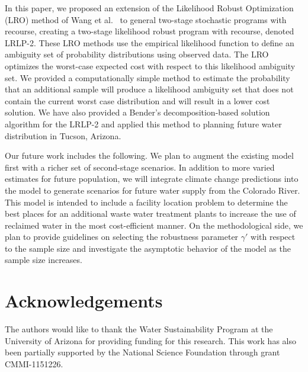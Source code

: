 \documentclass{iserc}
\begin{document}
In this paper, we proposed an extension of the Likelihood Robust Optimization (LRO) method of Wang et al.\ \cite{wang2010likelihood} to general two-stage stochastic programs with recourse, creating a two-stage likelihood robust program with recourse, denoted LRLP-2.
These LRO methods use the empirical likelihood function to define an ambiguity set of probability distributions using observed data.
The LRO optimizes the worst-case expected cost with respect to this likelihood ambiguity set.
We provided a computationally simple method to estimate the probability that an additional sample will produce a likelihood ambiguity set that does not contain the current worst case distribution and will result in a lower cost solution. 
We have also provided a Bender's decomposition-based solution algorithm for the LRLP-2 and applied this method to planning future water distribution in Tucson, Arizona.

Our future work includes the following. We plan to augment the existing model first with a richer set of second-stage scenarios.
In addition to more varied estimates for future population, we will integrate climate change predictions into the model to generate scenarios for future water supply from the Colorado River. 
This model is intended to include a facility location problem to determine the best places for an additional waste water treatment plants to increase the use of reclaimed water in the most cost-efficient manner. On the methodological side, we plan to provide guidelines on selecting the robustness parameter $\gamma'$ with respect to the sample size and investigate the asymptotic behavior of the model as the sample size increases. 

\section*{Acknowledgements}
The authors would like to thank the Water Sustainability Program at the University of Arizona for providing funding for this research. 
This work has also been partially supported by the National Science Foundation through grant CMMI-1151226.


\end{document}
